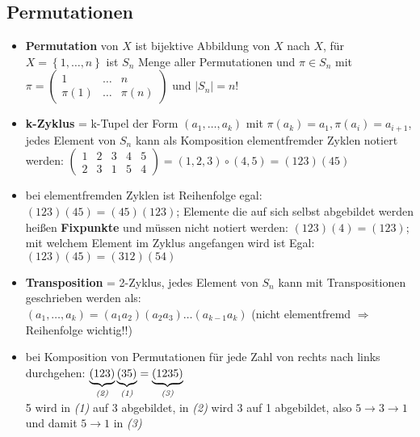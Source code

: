 \documentclass[10pt,a4paper]{article}
\begin{document}
\subsection{Permutationen}
\begin{itemize}
\item \textbf{Permutation} von $X$ ist bijektive Abbildung von $X$ nach $X$, für $X=\left\lbrace 1,\dotsc, n\right\rbrace$ ist $S_{n}$ Menge aller Permutationen und $\pi \in S_{n}$ mit $\pi=\begin{pmatrix}1&\dotsc& n\\ \pi(1)&\dotsc &\pi(n)\end{pmatrix} $ und $\vert S_{n}\vert =n!$
\item \textbf{k-Zyklus} = k-Tupel der Form $(a_{1},\dotsc,a_{k})$ mit $\pi(a_{k})=a_{1}, \pi(a_{i})=a_{i+1}$, jedes Element von $S_{n}$ kann als Komposition elementfremder Zyklen notiert werden: $\begin{pmatrix}1&2& 3&4&5\\ 2&3&1&5&4\end{pmatrix}=(1,2,3)\circ (4,5)=(123)(45)$
\item bei elementfremden Zyklen ist Reihenfolge egal: $(123)(45)=(45)(123)$; Elemente die auf sich selbst abgebildet werden heißen \textbf{Fixpunkte} und müssen nicht notiert werden: $(123)(4)=(123)$; mit welchem Element im Zyklus angefangen wird ist Egal: $(123)(45)=(312)(54)$ 
\item \textbf{Transposition} = 2-Zyklus, jedes Element von $S_{n}$ kann mit Transpositionen geschrieben werden als:\\ $(a_{1},\dotsc, a_{k})=(a_{1}a_{2})(a_{2}a_{3})\dotsc(a_{k-1}a_{k})$ (nicht elementfremd $\Rightarrow$ Reihenfolge wichtig!!)
\item bei Komposition von Permutationen für jede Zahl von rechts nach links durchgehen: $\underbrace{(123)}_{\text{\textit{(2)}}}\underbrace{(35)}_{\text{\textit{(1)}}}=\underbrace{(1235)}_{\text{\textit{(3)}}}$\\5 wird in \textit{(1)} auf 3 abgebildet, in \textit{(2)} wird 3 auf 1 abgebildet, also $5\rightarrow 3 \rightarrow 1$ und damit $5\rightarrow 1$  in \textit{(3)} 
\end{itemize}
\end{document}

